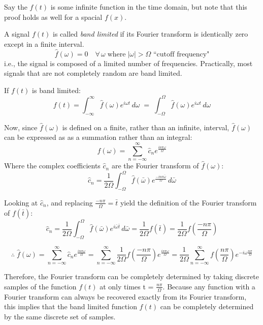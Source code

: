 \documentclass[12pt]{article}
\newcommand{\inftyint}{\int_{-\infty}^{\infty}}
\begin{document}
Say the \(f(t)\) is some infinite function in the time domain, but note that
this proof holds as well for a spacial \(f(x)\).

A signal \(f(t)\) is called \emph{band limited} if its Fourier transform is
identically zero except in a finite interval.  \[\hat{f}(\omega) = 0 \quad
\forall \, \omega \; \text{where} \; |\omega| > \Omega \text{ ``cutoff
frequency"}\] i.e., the signal is composed of a limited number of frequencies.
Practically, most signals that are not completely random are band limited.

If \(f(t)\) is band limited: \begin{equation} \label{eq:nft} f(t) = \inftyint
    \hat{f}(\omega)e^{i\omega t} \,d\omega \; = \; \int_{-\Omega}^{\Omega}
    \hat{f}(\omega)e^{i\omega t} \,d\omega \end{equation}

Now, since \( \hat{f}(\omega) \) is defined on a finite, rather than an
infinite, interval, \( \hat{f}(\omega) \) can be expressed as as a summation
rather than an integral: \[\hat{f}(\omega) = \sum_{n = -\infty}^{\infty}
\hat{c}_{n}e^{\frac{i n \pi \omega}{\Omega}} \] Where the complex coefficients
\( \hat{c}_n\) are the Fourier transform of \( \hat{f}(\omega) \): \[\hat{ c}_n
= \frac{1}{2\Omega} \int_{-\Omega}^{\Omega} \hat{f}(\bar{\omega})e^{\frac{-i n
\pi \bar{ \omega}}{\Omega}}\,d\bar{\omega}\]

Looking at \(\hat{c}_n\), and replacing \( \frac{-n\pi}{\Omega} = \bar{t}\)
yield the definition of the Fourier transform of \( f(\bar{t})\): \[ \hat{c}_n
= \frac{1}{2\Omega} \int_{-\Omega}^{\Omega}
\hat{f}(\bar{\omega})e^{i\bar{\omega}\bar{t}}\,d\bar{\omega} =
\frac{1}{2\Omega} f(\bar{t}) = \frac{1}{2\Omega} f(\frac{-n\pi}{\Omega})\]

\begin{equation} \label{eq:nfhat} \therefore \; \hat{f}(\omega) = \sum_{n =
    -\infty}^{\infty} \hat{c}_{n}e^{\frac{i n \pi \omega}{\Omega}} = \sum_{n =
    -\infty}^{\infty} \frac{1}{2\Omega} f(\frac{-n\pi}{\Omega})e^{\frac{i n \pi
    \omega}{\Omega}} = \frac{1}{2\Omega} \sum_{n = -\infty}^{\infty}
    f(\frac{n\pi}{\Omega})e^{-i \omega \frac{n \pi}{\Omega} } \end{equation}

Therefore, the Fourier transform can be completely determined by taking
discrete samples of the function \( f(t) \) at only times t = \(
\frac{n\pi}{\Omega}\). Because any function with a Fourier transform can 
always be recovered exactly from its Fourier transform, this implies that the 
band limited function \( f(t)\) can be completely determined by the same 
discrete set of samples.
\end{document}
